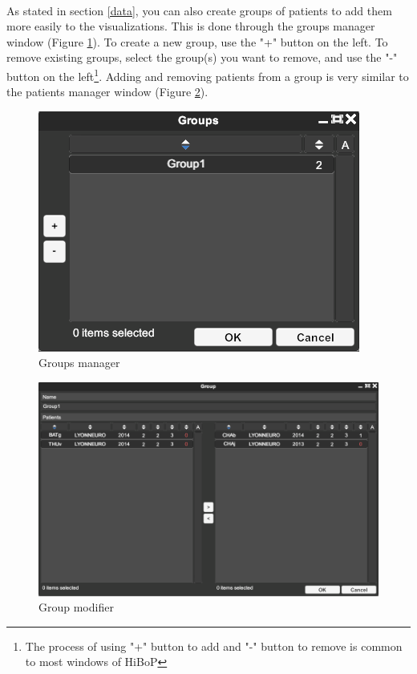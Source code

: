 \documentclass[a4paper]{article}
\begin{document}
\paragraph{} As stated in section \ref{data}, you can also create groups of patients to add them more easily to the visualizations. This is done through the groups manager window (Figure \ref{groupGestionUI}). To create a new group, use the "+" button on the left. To remove existing groups, select the group(s) you want to remove, and use the "-" button on the left\footnote{The process of using "+" button to add and "-" button to remove is common to most windows of HiBoP}. Adding and removing patients from a group is very similar to the patients manager window (Figure \ref{groupModifierUI}).
\begin{figure}[H]
\begin{center}
\includegraphics[scale=0.5]{GroupGestion.png}
\end{center}
\caption{\label{groupGestionUI}Groups manager}
\end{figure}
\begin{figure}[H]
\begin{center}
\includegraphics[scale=0.3]{GroupModifier.png}
\end{center}
\caption{\label{groupModifierUI}Group modifier}
\end{figure}
\end{document}

